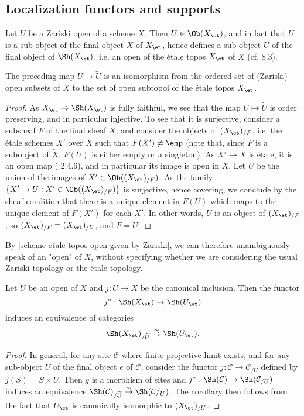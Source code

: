 \subsection{Localization functors and supports}
Let $U$ be a Zariski open of a scheme $X$. Then $U\in\Ob(X_\et)$, and in fact that $U$ is a sub-object of the final object $X$ of $X_\et$, hence defines a sub-object $\widetilde{U}$ of the final object of $\Sh(X_\et)$, i.e. an open of the \'etale topos $X_\et$ of $X$ (cf. \cite{SGA4-1} 8.3).
\begin{proposition}\label{scheme etale topos open given by Zariski}
The preceding map $U\mapsto\widetilde{U}$ is an isomorphism from the ordered set of (Zariski) open subsets of $X$ to the set of open subtopoi of the \'etale topos $X_\et$.
\end{proposition}
\begin{proof}
As $X_\et\to\Sh(X_\et)$ is fully faithful, we see that the map $U\mapsto\widetilde{U}$ is order preserving, and in particular injective. To see that it is surjective, consider a subsheaf $F$ of the final sheaf $\widetilde{X}$, and consider the objects of $(X_{\et})_{/F}$, i.e. the \'etale schemes $X'$ over $X$ such that $F(X')\neq\emp$ (note that, since $F$ is a subobject of $\widetilde{X}$, $F(U)$ is either empty or a singleton). As $X'\to X$ is \'etale, it is an open map (\cite{EGA4-2} 2.4.6), and in particular its image is open in $X$. Let $U$ be the union of the images of $X'\in\Ob((X_{\et})_{/F})$. As the family $\{X'\to U:X'\in\Ob((X_{\et})_{/F})\}$ is surjective, hence covering, we conclude by the sheaf condition that there is a unique element in $F(U)$ which maps to the unique element of $F(X')$ for each $X'$. In other words, $U$ is an object of $(X_{\et})_{/F}$, so $(X_\et)_{/F}=(X_\et)_{/U}$, and $F=U$.
\end{proof}

By \cref{scheme etale topos open given by Zariski}, we can therefore unambiguously speak of an "open" of $X$, without specifying whether we are considering the usual Zariski topology or the \'etale topology.

\begin{corollary}\label{scheme etale topos comma on open char}
Let $U$ be an open of $X$ and $j:U\to X$ be the canonical inclusion. Then the functor 
\[j^*:\Sh(X_\et)\to\Sh(U_\et)\]
induces an equivalence of categories
\[\Sh(X_\et)_{/\widetilde{U}} \stackrel{\sim}{\to} \Sh(U_\et).\]

\end{corollary}
\begin{proof}
In general, for any site $\mathcal{C}$ where finite projective limit exists, and for any sub-object $U$ of the final object $e$ of $\mathcal{C}$, consider the functor $j:\mathcal{C}\to\mathcal{C}_{/U}$ defined by $j(S)=S\times U$. Then $g$ is a morphism of sites and $j^*:\Sh(\mathcal{C})\to\Sh(\mathcal{C}_{/U})$ induces an equivalence $\Sh(\mathcal{C})_{/\widetilde{U}}\stackrel{\sim}{\to}\Sh(\mathcal{C}/_{U})$. The corollary then follows from the fact that $U_\et$ is canonically isomorphic to $(X_\et)_{/U}$.
\end{proof}

